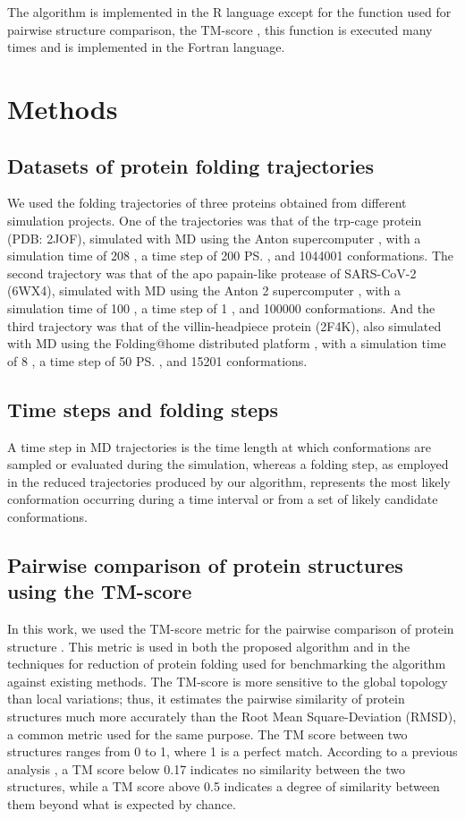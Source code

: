 \documentclass[twocolumn]{bmcart}%
\begin{document}
The algorithm is implemented in the R language except for the function used for pairwise structure comparison, the TM-score \cite{Zhang2004}, this function is executed many times and is implemented in the Fortran language.

\section*{Methods}

\subsection*{Datasets of protein folding trajectories}

We used the folding trajectories of three proteins obtained from different simulation projects. One of the trajectories was that of the trp-cage protein (PDB: 2JOF), simulated with MD using the Anton supercomputer \cite{Shaw2011}, with a simulation time of 208 \us, a time step of 200 \ps, and 1044001 conformations. The second trajectory was that of the apo papain-like protease of SARS-CoV-2 (6WX4), simulated with MD using the Anton 2 supercomputer \cite{Shaw2020}, with a simulation time of 100 \us, a time step of 1 \ns, and 100000 conformations. And the third trajectory was that of the villin-headpiece protein (2F4K), also simulated with MD using the Folding@home distributed platform \cite{PandeEnsign07}, with a simulation time of 8 \us, a time step of 50 \ps, and 15201 conformations.

\subsection*{Time steps and folding steps}

A time step in MD trajectories is the time length at which conformations are sampled or evaluated during the simulation, whereas a folding step, as employed in the reduced trajectories produced by our algorithm, represents the most likely conformation occurring during a time interval or from a set of likely candidate conformations.

\subsection*{Pairwise comparison of protein structures using the TM-score \label{sec:Comparing-Structures}}

In this work, we used the TM-score metric for the pairwise comparison of protein structure \cite{Zhang2004}. This metric is used in both the proposed algorithm and in the techniques for reduction of protein folding used for benchmarking the algorithm against existing methods. The TM-score is more sensitive to the global topology than local variations; thus, it estimates the pairwise similarity of protein structures much more accurately than the Root Mean Square-Deviation (RMSD), a common metric used for the same purpose. The TM score between two structures ranges from 0 to 1, where 1 is a perfect match. According to a previous analysis \cite{zhang2010}, a TM score below 0.17 indicates no similarity between the two structures, while a TM score above 0.5 indicates a degree of similarity between them beyond what is expected by chance.
\end{document}
